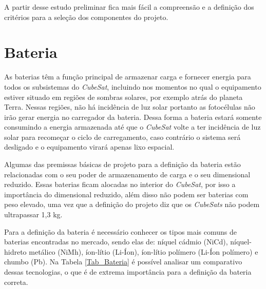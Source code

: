 \documentclass[
	12pt,				%
	openright,			%
	oneside,			%
	a4paper,			%
	english,			%
	french,				%
	spanish,			%
	brazil,				%
	oldfontcommands
	]{abntex2}
\begin{document}
	A partir desse estudo preliminar fica mais fácil a compreensão e a definição dos critérios para a seleção dos componentes do projeto.	
	
\section[Bateria]{Bateria} \label{Sec_Bateria}
	
As baterias têm a função principal de armazenar carga e fornecer energia para todos os subsistemas do \textit{CubeSat}, incluindo nos momentos no qual o equipamento estiver situado em regiões de sombras solares, por exemplo atrás do planeta Terra. Nessas regiões, não há incidência de luz solar portanto as fotocélulas não irão gerar energia no carregador da bateria. Dessa forma a bateria estará somente consumindo a energia armazenada até que o \textit{CubeSat} volte a ter incidência de luz solar para recomeçar o ciclo de carregamento, caso contrário o sistema será desligado e o equipamento virará apenas lixo espacial.	
	
	Algumas das premissas básicas de projeto para a definição da bateria estão relacionadas com o seu poder de armazenamento de carga e o seu dimensional reduzido. Essas baterias ficam alocadas no interior do \textit{CubeSat}, por isso a importância do dimensional reduzido, além disso não podem ser baterias com peso elevado, uma vez que a definição do projeto diz que os \textit{CubeSats} não podem ultrapassar 1,3 kg.
	
	Para a definição da bateria é necessário conhecer os tipos mais comuns de baterias encontradas no mercado, sendo elas de: níquel cádmio (NiCd), níquel-hidreto metálico (NiMh), íon-lítio (Li-Íon), íon-lítio polímero (Li-Íon polímero) e chumbo (Pb). Na Tabela \ref{Tab_Bateria} é possível analisar um comparativo dessas tecnologias, o que é de extrema importância para a definição da bateria correta. 
		
\end{document}
